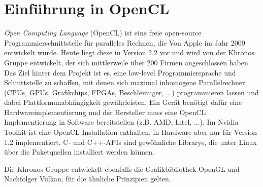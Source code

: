 	\chapter{Einf\"uhrung in OpenCL}
	\textit{Open Computing Language} (OpenCL) ist eine freie open-source Programmierschnittstelle für paralleles Rechnen, die Von Apple im Jahr 2009 entwickelt wurde. Heute liegt diese in Version 2.2 vor und wird von der Khronos Gruppe entwickelt, der sich mittlerweile über 200 Firmen angeschlossen haben. Das Ziel hinter dem Projekt ist es, eine low-level Programmiersprache und Schnittstelle zu schaffen, mit denen sich maximal inhomogene Parallelrechner (CPUs, GPUs, Grafikchips, FPGAs, Beschleuniger, ...) programmieren lassen und dabei Plattformunabhängigkeit gewährleisten. Ein Gerät benötigt dafür eine Hardwareimplementierung und der Hersteller muss eine OpenCL Implementierung in Software bereitstellen (z.B. AMD, Intel, ...). Im Nvidia Toolkit ist eine OpenCL Installation enthalten, in Hardware aber nur für Version 1.2 implementiert. C- und C++-\Glspl{API} sind gewöhnliche Librarys, die unter Linux über die Paketquellen installiert werden können.
	
	Die Khronos Gruppe entwickelt ebenfalls die Grafikbibliothek OpenGL und Nachfolger Vulkan, für die ähnliche Prinzipien gelten. 
	 
